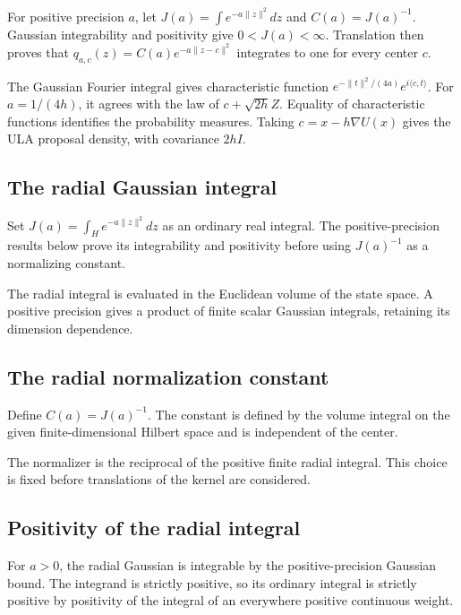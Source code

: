 \documentclass[11pt,a4paper]{article}
\begin{document}
For positive precision \(a\), let \(J(a)=\int e^{-a\|z\|^2}dz\) and \(C(a)=J(a)^{-1}\). Gaussian integrability and positivity give \(0<J(a)<\infty\). Translation then proves that \(q_{a,c}(z)=C(a)e^{-a\|z-c\|^2}\) integrates to one for every center \(c\).



The Gaussian Fourier integral gives characteristic function \(e^{-\|t\|^2/(4a)}e^{i\langle c,t\rangle}\). For \(a=1/(4h)\), it agrees with the law of \(c+\sqrt{2h}Z\). Equality of characteristic functions identifies the probability measures. Taking \(c=x-h\nabla U(x)\) gives the ULA proposal density, with covariance \(2hI\).


\subsection{\texorpdfstring{The radial Gaussian integral}{The radial Gaussian integral}}


Set \(J(a)=\int_H e^{-a\|z\|^2}dz\) as an ordinary real integral. The positive-precision results below prove its integrability and positivity before using \(J(a)^{-1}\) as a normalizing constant.



The radial integral is evaluated in the Euclidean volume of the state space. A positive precision gives a product of finite scalar Gaussian integrals, retaining its dimension dependence.


\subsection{\texorpdfstring{The radial normalization constant}{The radial normalization constant}}


Define \(C(a)=J(a)^{-1}\). The constant is defined by the volume integral on the given finite-dimensional Hilbert space and is independent of the center.



The normalizer is the reciprocal of the positive finite radial integral. This choice is fixed before translations of the kernel are considered.


\subsection{\texorpdfstring{Positivity of the radial integral}{Positivity of the radial integral}}


For \(a>0\), the radial Gaussian is integrable by the positive-precision Gaussian bound. The integrand is strictly positive, so its ordinary integral is strictly positive by positivity of the integral of an everywhere positive continuous weight.
\end{document}
